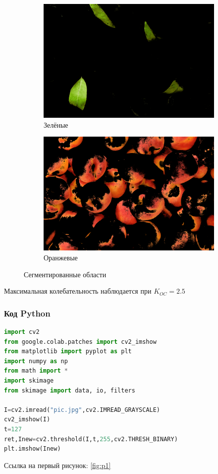 \begin{figure}[!htbp]
\centering
\begin{subfigure}{.5\textwidth}
  \centering
  \includegraphics[width=0.8\linewidth]{assets/images/example1/5.png}
  \caption{Зелёные}
  \label{fig:sub1}
\end{subfigure}%
\begin{subfigure}{.5\textwidth}
  \centering
  \includegraphics[width=0.8\linewidth]{assets/images/example1/6.png}
  \caption{Оранжевые}
  \label{fig:sub2}
\end{subfigure}
\label{fig:test}
\caption{Сегментированные области}
\end{figure}

Максимальная колебательность наблюдается при $K_{OC} = 2.5$

\subsubsection{Код Python}

\begin{lstlisting}[language=Python, caption=Импорт и обычная бинаризация]
import cv2
from google.colab.patches import cv2_imshow
from matplotlib import pyplot as plt
import numpy as np
from math import *
import skimage
from skimage import data, io, filters

I=cv2.imread("pic.jpg",cv2.IMREAD_GRAYSCALE)
cv2_imshow(I)
t=127
ret,Inew=cv2.threshold(I,t,255,cv2.THRESH_BINARY)
plt.imshow(Inew)
\end{lstlisting}

Ссылка на первый рисунок: \ref{fig:p1}